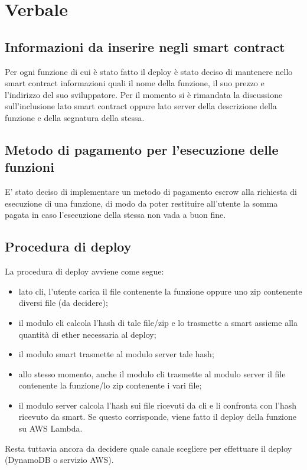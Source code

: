 \section{Verbale}

	\subsection{Informazioni da inserire negli smart contract}
	Per ogni funzione di cui è stato fatto il deploy è stato deciso di mantenere nello smart contract informazioni quali il nome della funzione, il suo prezzo e l'indirizzo del suo sviluppatore. Per il momento si è rimandata la discussione sull'inclusione lato smart contract oppure lato server della descrizione della funzione e della segnatura della stessa.
	
	\subsection{Metodo di pagamento per l'esecuzione delle funzioni}
	E' stato deciso di implementare un metodo di pagamento escrow alla richiesta di esecuzione di una funzione, di modo da poter restituire all'utente la somma pagata in caso l'esecuzione della stessa non vada a buon fine.
	
	\subsection{Procedura di deploy}
	La procedura di deploy avviene come segue:
		\begin{itemize}
			\item lato cli, l'utente carica il file contenente la funzione oppure uno zip contenente diversi file (da decidere);
			\item il modulo cli calcola l'hash di tale file/zip e lo trasmette a smart assieme alla quantità di ether necessaria al deploy;
			\item il modulo smart trasmette al modulo server tale hash;
			\item allo stesso momento, anche il modulo cli trasmette al modulo server il file contenente la funzione/lo zip contenente i vari file;
			\item il modulo server calcola l'hash sui file ricevuti da cli e li confronta con l'hash ricevuto da smart. Se questo corrisponde, viene fatto il deploy della funzione su AWS Lambda.	
		\end{itemize}
	Resta tuttavia ancora da decidere quale canale scegliere per effettuare il deploy (DynamoDB o servizio AWS).
	
